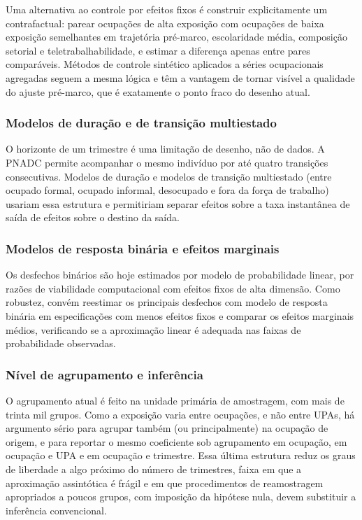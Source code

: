 Uma alternativa ao controle por efeitos fixos é construir explicitamente um
contrafactual: parear ocupações de alta exposição com ocupações de baixa
exposição semelhantes em trajetória pré-marco, escolaridade média, composição
setorial e teletrabalhabilidade, e estimar a diferença apenas entre pares
comparáveis. Métodos de controle sintético aplicados a séries ocupacionais
agregadas seguem a mesma lógica e têm a vantagem de tornar visível a qualidade
do ajuste pré-marco, que é exatamente o ponto fraco do desenho atual.

\subsubsection{Modelos de duração e de transição multiestado}

O horizonte de um trimestre é uma limitação de desenho, não de dados. A PNADC
permite acompanhar o mesmo indivíduo por até quatro transições consecutivas.
Modelos de duração e modelos de transição multiestado (entre ocupado formal,
ocupado informal, desocupado e fora da força de trabalho) usariam essa
estrutura e permitiriam separar efeitos sobre a taxa instantânea de saída de
efeitos sobre o destino da saída.

\subsubsection{Modelos de resposta binária e efeitos marginais}

Os desfechos binários são hoje estimados por modelo de probabilidade linear, por
razões de viabilidade computacional com efeitos fixos de alta dimensão. Como
robustez, convém reestimar os principais desfechos com modelo de resposta
binária em especificações com menos efeitos fixos e comparar os efeitos
marginais médios, verificando se a aproximação linear é adequada nas faixas de
probabilidade observadas.

\subsubsection{Nível de agrupamento e inferência}

O agrupamento atual é feito na unidade primária de amostragem, com mais de trinta
mil grupos. Como a exposição varia entre ocupações, e não entre UPAs, há
argumento sério para agrupar também (ou principalmente) na ocupação de
origem, e para reportar o mesmo coeficiente sob agrupamento em ocupação, em
ocupação e UPA e em ocupação e trimestre. Essa última estrutura reduz os graus
de liberdade a algo próximo do número de trimestres, faixa em que a aproximação
assintótica é frágil e em que procedimentos de reamostragem apropriados a poucos
grupos, com imposição da hipótese nula, devem substituir a inferência
convencional.

